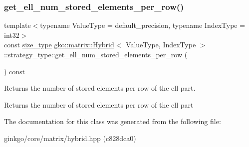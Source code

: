 \subsubsection{\texorpdfstring{get\+\_\+ell\+\_\+num\+\_\+stored\+\_\+elements\+\_\+per\+\_\+row()}{get\_ell\_num\_stored\_elements\_per\_row()}}
{\footnotesize\ttfamily template$<$typename Value\+Type = default\+\_\+precision, typename Index\+Type = int32$>$ \\
const \hyperlink{namespacegko_a6e5c95df0ae4e47aab2f604a22d98ee7}{size\+\_\+type} \hyperlink{classgko_1_1matrix_1_1Hybrid}{gko\+::matrix\+::\+Hybrid}$<$ Value\+Type, Index\+Type $>$\+::strategy\+\_\+type\+::get\+\_\+ell\+\_\+num\+\_\+stored\+\_\+elements\+\_\+per\+\_\+row (\begin{DoxyParamCaption}{ }\end{DoxyParamCaption}) const\hspace{0.3cm}{\ttfamily [noexcept]}}



Returns the number of stored elements per row of the ell part. 

\begin{DoxyReturn}{Returns}
the number of stored elements per row of the ell part 
\end{DoxyReturn}


The documentation for this class was generated from the following file\+:\begin{DoxyCompactItemize}
\item 
ginkgo/core/matrix/hybrid.\+hpp (c828dca0)\end{DoxyCompactItemize}
